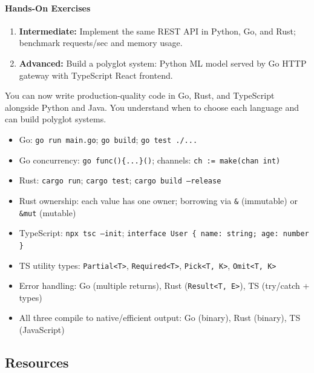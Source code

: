 \documentclass[11pt, a4paper, oneside]{report}
\begin{document}
\paragraph{Hands-On Exercises}
\begin{enumerate}[leftmargin=*]
\item \textbf{Intermediate:} Implement the same REST API in Python, Go, and Rust; benchmark requests/sec and memory usage.
\item \textbf{Advanced:} Build a polyglot system: Python ML model served by Go HTTP gateway with TypeScript React frontend.
\end{enumerate}

\begin{microcheckpoint}
You can now write production-quality code in Go, Rust, and TypeScript alongside Python and Java. You understand when to choose each language and can build polyglot systems.
\end{microcheckpoint}

\begin{cheatsheetbox}
\begin{itemize}[leftmargin=*]
\item Go: \texttt{go run main.go}; \texttt{go build}; \texttt{go test ./...}
\item Go concurrency: \texttt{go func()\{...\}()}; channels: \texttt{ch := make(chan int)}
\item Rust: \texttt{cargo run}; \texttt{cargo test}; \texttt{cargo build --release}
\item Rust ownership: each value has one owner; borrowing via \texttt{\&} (immutable) or \texttt{\&mut} (mutable)
\item TypeScript: \texttt{npx tsc --init}; \texttt{interface User \{ name: string; age: number \}}
\item TS utility types: \texttt{Partial<T>}, \texttt{Required<T>}, \texttt{Pick<T, K>}, \texttt{Omit<T, K>}
\item Error handling: Go (multiple returns), Rust (\texttt{Result<T, E>}), TS (try/catch + types)
\item All three compile to native/efficient output: Go (binary), Rust (binary), TS (JavaScript)
\end{itemize}
\end{cheatsheetbox}

\subsection*{Resources}
\end{document}
